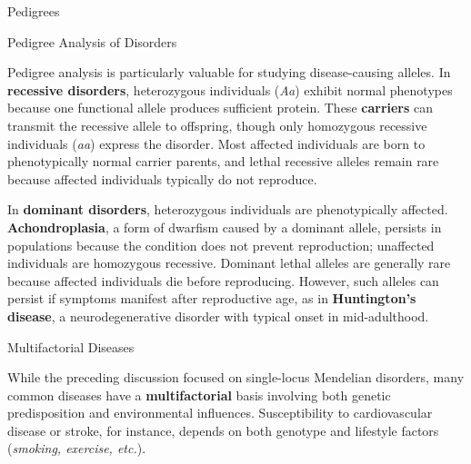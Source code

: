 \documentclass[10pt]{article}
\begin{document}
    \begin{core}{Pedigrees}


    \end{core}

    \begin{core}[label=core:pedigree_disorders]{Pedigree Analysis of Disorders}

      Pedigree analysis is particularly valuable for studying disease-causing alleles. In \textbf{recessive disorders}, heterozygous individuals (\textit{Aa}) exhibit normal phenotypes because one functional allele produces sufficient protein. These \textbf{carriers} can transmit the recessive allele to offspring, though only homozygous recessive individuals (\textit{aa}) express the disorder. Most affected individuals are born to phenotypically normal carrier parents, and lethal recessive alleles remain rare because affected individuals typically do not reproduce.
      
      In \textbf{dominant disorders}, heterozygous individuals are phenotypically affected. \textbf{Achondroplasia}, a form of dwarfism caused by a dominant allele, persists in populations because the condition does not prevent reproduction; unaffected individuals are homozygous recessive. Dominant lethal alleles are generally rare because affected individuals die before reproducing. However, such alleles can persist if symptoms manifest after reproductive age, as in \textbf{Huntington's disease}, a neurodegenerative disorder with typical onset in mid-adulthood.

    \end{core}

    \begin{core}{Multifactorial Diseases}

      While the preceding discussion focused on single-locus Mendelian disorders, many common diseases have a \textbf{multifactorial} basis involving both genetic predisposition and environmental influences. Susceptibility to cardiovascular disease or stroke, for instance, depends on both genotype and lifestyle factors (\textit{smoking, exercise, etc.}).

    \end{core}
\end{document}
